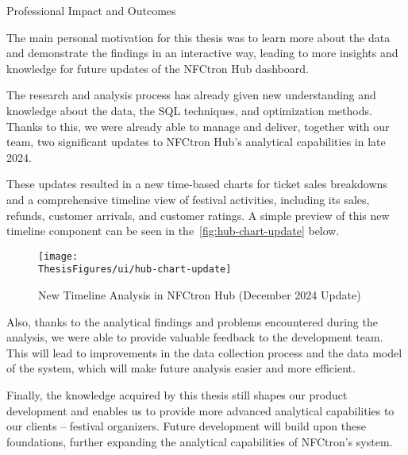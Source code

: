 \begin{section}{Professional Impact and Outcomes}
	\label{sec:future-impact}

	The main personal motivation for this thesis was to learn more about the data and demonstrate the findings in an interactive way, leading to more insights and knowledge for future updates of the NFCtron Hub dashboard.

	The research and analysis process has already given new understanding and knowledge about the data, the SQL techniques, and optimization methods.
	Thanks to this, we were already able to manage and deliver, together with our team, two significant updates to NFCtron Hub's analytical capabilities in late 2024.

	These updates resulted in a new time-based charts for ticket sales breakdowns and a comprehensive timeline view of festival activities, including its sales, refunds, customer arrivals, and customer ratings.
	A simple preview of this new timeline component can be seen in the~\autoref{fig:hub-chart-update} below.

	\begin{figure}[h]
		\centering
		\texttt{[image: \\ThesisFigures/ui/hub-chart-update]}
		\caption{New Timeline Analysis in NFCtron Hub (December 2024 Update)}
		\label{fig:hub-chart-update}
	\end{figure}

	Also, thanks to the analytical findings and problems encountered during the analysis, we were able to provide valuable feedback to the development team.
	This will lead to improvements in the data collection process and the data model of the system, which will make future analysis easier and more efficient.

	Finally, the knowledge acquired by this thesis still shapes our product development and enables us to provide more advanced analytical capabilities to our clients – festival organizers.
	Future development will build upon these foundations, further expanding the analytical capabilities of NFCtron's system.
\end{section}